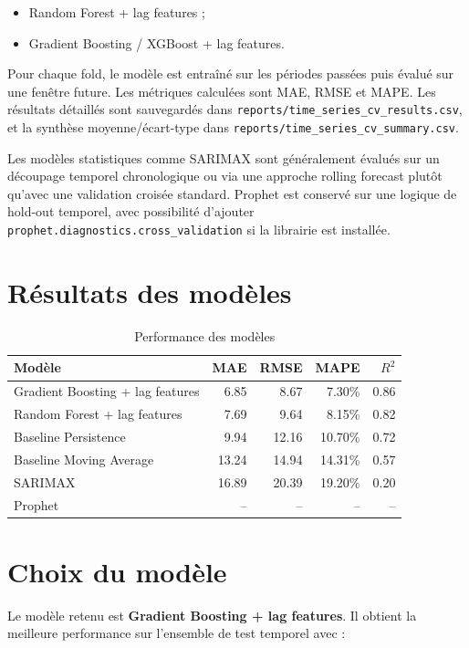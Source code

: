 \documentclass[11pt,a4paper]{report}
\begin{document}
\begin{itemize}[leftmargin=*]
    \item Random Forest + lag features ;
    \item Gradient Boosting / XGBoost + lag features.
\end{itemize}

Pour chaque fold, le modèle est entraîné sur les périodes passées puis évalué sur une fenêtre future. Les métriques calculées sont MAE, RMSE et MAPE. Les résultats détaillés sont sauvegardés dans \texttt{reports/time\_series\_cv\_results.csv}, et la synthèse moyenne/écart-type dans \texttt{reports/time\_series\_cv\_summary.csv}.

Les modèles statistiques comme SARIMAX sont généralement évalués sur un découpage temporel chronologique ou via une approche rolling forecast plutôt qu'avec une validation croisée standard. Prophet est conservé sur une logique de hold-out temporel, avec possibilité d'ajouter \texttt{prophet.diagnostics.cross\_validation} si la librairie est installée.

\section{Résultats des modèles}

\begin{table}[H]
\centering
\caption{Performance des modèles}
\begin{tabular}{lrrrr}
\toprule
\textbf{Modèle} & \textbf{MAE} & \textbf{RMSE} & \textbf{MAPE} & \textbf{$R^2$} \\
\midrule
Gradient Boosting + lag features & 6.85 & 8.67 & 7.30\% & 0.86 \\
Random Forest + lag features & 7.69 & 9.64 & 8.15\% & 0.82 \\
Baseline Persistence & 9.94 & 12.16 & 10.70\% & 0.72 \\
Baseline Moving Average & 13.24 & 14.94 & 14.31\% & 0.57 \\
SARIMAX & 16.89 & 20.39 & 19.20\% & 0.20 \\
Prophet & -- & -- & -- & -- \\
\bottomrule
\end{tabular}
\end{table}

\section{Choix du modèle}

Le modèle retenu est \textbf{Gradient Boosting + lag features}. Il obtient la meilleure performance sur l'ensemble de test temporel avec :
\end{document}
